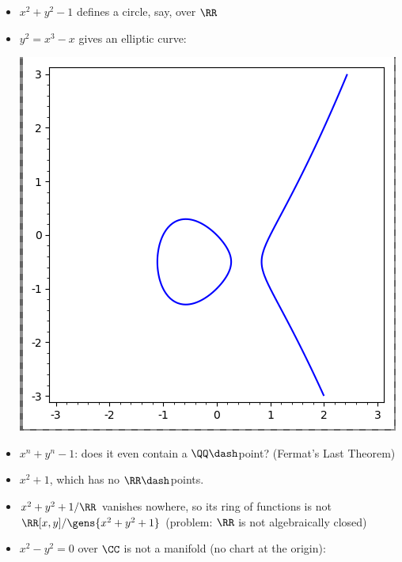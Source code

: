 \begin{example}

\hfill

\begin{itemize}
\item
  \(x^2 + y^2 - 1\) defines a circle, say, over \(\RR\)
\item
  \(y^2 = x^3-x\) gives an elliptic curve:

  \includegraphics{figures/image_2020-08-21-01-04-22.png}
\item
  \(x^n+y^n-1\): does it even contain a \(\QQ\dash\)point? (Fermat's
  Last Theorem)
\item
  \(x^2 + 1\), which has no \(\RR\dash\)points.
\item
  \(x^2 + y^2 + 1/\RR\) vanishes nowhere, so its ring of functions is
  not \(\RR[x, y] / \gens{x^2 + y^2 + 1}\) (problem: \(\RR\) is not
  algebraically closed)
\item
  \(x^2 - y^2 = 0\) over \(\CC\) is not a manifold (no chart at the
  origin):


\end{itemize}
\end{example}
